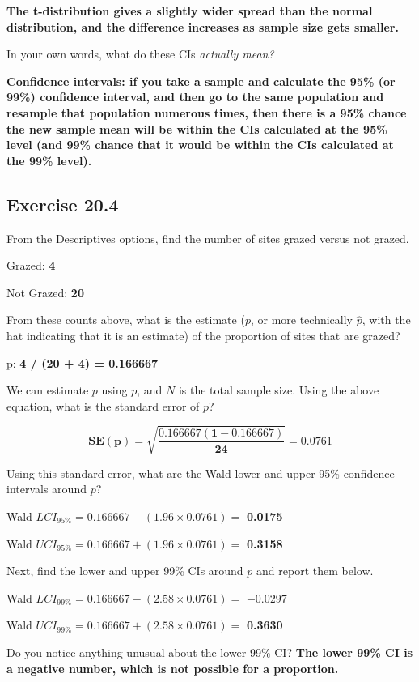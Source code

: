 \documentclass[
  openany]{krantz}
\begin{document}
\textbf{The t-distribution gives a slightly wider spread than the normal distribution, and the difference increases as sample size gets smaller.}

In your own words, what do these CIs \emph{actually mean?}

\textbf{Confidence intervals: if you take a sample and calculate the 95\% (or 99\%) confidence interval, and then go to the same population and resample that population numerous times, then there is a 95\% chance the new sample mean will be within the CIs calculated at the 95\% level (and 99\% chance that it would be within the CIs calculated at the 99\% level).}

\hypertarget{exercise-20.4}{%
\subsection{Exercise 20.4}\label{exercise-20.4}}

From the Descriptives options, find the number of sites grazed versus not grazed.

Grazed: \textbf{4}

Not Grazed: \textbf{20}

From these counts above, what is the estimate (\(p\), or more technically \(\hat{p}\), with the hat indicating that it is an estimate) of the proportion of sites that are grazed?

p: \textbf{4 / (20 + 4) = 0.166667}

We can estimate \(p\) using \(p\), and \(N\) is the total sample size. Using the above equation, what is the standard error of \(p\)?

\[\mathbf{SE(p) = \sqrt{\frac{0.166667(1 - 0.166667)}{24}} = 0.0761}\]

Using this standard error, what are the Wald lower and upper 95\% confidence intervals around \(p\)?

Wald \(LCI_{95\%} = 0.166667 - (1.96 \times 0.0761) =\) \textbf{0.0175}

Wald \(UCI_{95\%} = 0.166667 + (1.96 \times 0.0761) =\) \textbf{0.3158}

Next, find the lower and upper 99\% CIs around \(p\) and report them below.

Wald \(LCI_{99\%} = 0.166667 - (2.58 \times 0.0761) =\) \textbf{\(\mathbf{-0.0297}\)}

Wald \(UCI_{99\%} = 0.166667 + (2.58 \times 0.0761) =\) \textbf{0.3630}

Do you notice anything unusual about the lower 99\% CI? \textbf{The lower 99\% CI is a negative number, which is not possible for a proportion.}
\end{document}
